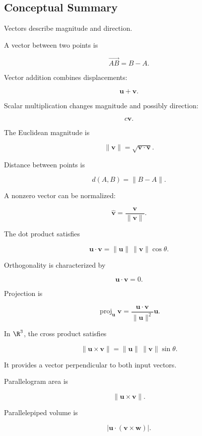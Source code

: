 \subsection{Conceptual Summary}
\label{subsec:vector-geometry-summary}

Vectors describe magnitude and direction.

A vector between two points is

\[ \boxed{\overrightarrow{AB}=B-A.} \]

Vector addition combines displacements:

\[ \boxed{\mathbf{u}+\mathbf{v}.} \]

Scalar multiplication changes magnitude and possibly direction:

\[ \boxed{c\mathbf{v}.} \]

The Euclidean magnitude is

\[ \boxed{\|\mathbf{v}\|=\sqrt{\mathbf{v}\cdot\mathbf{v}}.} \]

Distance between points is

\[ \boxed{d(A,B)=\|B-A\|.} \]

A nonzero vector can be normalized:

\[ \boxed{\widehat{\mathbf{v}}=\frac{\mathbf{v}}{\|\mathbf{v}\|}.} \]

The dot product satisfies

\[ \boxed{\mathbf{u}\cdot\mathbf{v}
=\|\mathbf{u}\|\,\|\mathbf{v}\|\cos\theta.} \]

Orthogonality is characterized by

\[ \boxed{\mathbf{u}\cdot\mathbf{v}=0.} \]

Projection is

\[
\boxed{
\operatorname{proj}_{\mathbf{u}}\mathbf{v}
=
\frac{\mathbf{u}\cdot\mathbf{v}}
{\|\mathbf{u}\|^2}\mathbf{u}.
}
\]

In \(\R^3\), the cross product satisfies

\[
\boxed{
\|\mathbf{u}\times\mathbf{v}\|
=
\|\mathbf{u}\|\,\|\mathbf{v}\|\sin\theta.
}
\]

It provides a vector perpendicular to both input vectors.

Parallelogram area is

\[ \boxed{\|\mathbf{u}\times\mathbf{v}\|.} \]

Parallelepiped volume is

\[
\boxed{
\left|
\mathbf{u}\cdot(\mathbf{v}\times\mathbf{w})
\right|.
}
\]

